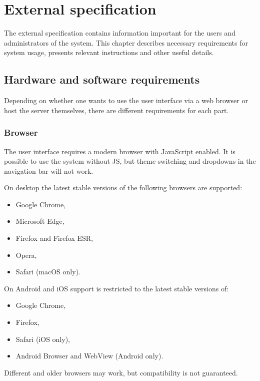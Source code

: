 \chapter{External specification}

The external specification contains information important for the users and administrators of the system. This chapter describes necessary requirements for system usage, presents relevant instructions and other useful details.

\section{Hardware and software requirements}

Depending on whether one wants to use the user interface via a web browser or host the server themselves, there are different requirements for each part.

\subsection{Browser}

The user interface requires a modern browser with JavaScript enabled. It is possible to use the system without JS, but theme switching and dropdowns in the navigation bar will not work.

On desktop the latest stable versions of the following browsers are supported:

\begin{itemize}
    \item Google Chrome,
    \item Microsoft Edge,
    \item Firefox and Firefox ESR,
    \item Opera,
    \item Safari (macOS only).
\end{itemize}

On Android and iOS support is restricted to the latest stable versions of:

\begin{itemize}
    \item Google Chrome,
    \item Firefox,
    \item Safari (iOS only),
    \item Android Browser and WebView (Android only).
\end{itemize}

Different and older browsers may work, but compatibility is not guaranteed.

